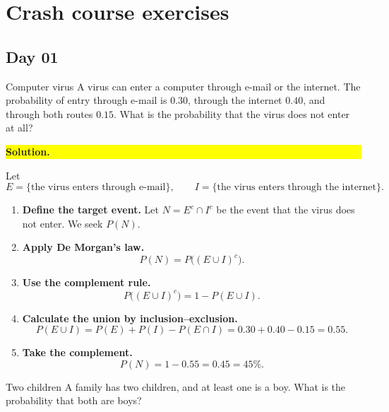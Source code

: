 \documentclass[a4paper,12pt,oneside]{report}
\newcommand{\solutionheading}[1]{%
  \par\Needspace{5\baselineskip}\noindent
  \begingroup\setlength{\fboxsep}{1pt}%
  \colorbox{yellow}{\strut\textbf{#1}}\endgroup\par\nobreak}
\begin{document}
\clearpage
\appendix

\chapter{Crash course exercises}


\section{Day 01}

\begin{framedexercise}{Computer virus}
A virus can enter a computer through e-mail or the internet. The
probability of entry through e-mail is $0.30$, through the internet
$0.40$, and through both routes $0.15$. What is the probability that
the virus does not enter at all?
\end{framedexercise}

\solutionheading{Solution.}
Let
\[
  E=\{\text{the virus enters through e-mail}\},\qquad
  I=\{\text{the virus enters through the internet}\}.
\]
\begin{enumerate}[label=\textbf{Step \arabic*:},leftmargin=*]
  \item \textbf{Define the target event.} Let $N=E^c\cap I^c$ be the
  event that the virus does not enter. We seek $P(N)$.
  \item \textbf{Apply De Morgan's law.}
  \[
    P(N)=P\bigl((E\cup I)^c\bigr).
  \]
  \item \textbf{Use the complement rule.}
  \[
    P\bigl((E\cup I)^c\bigr)=1-P(E\cup I).
  \]
  \item \textbf{Calculate the union by inclusion--exclusion.}
  \[
    P(E\cup I)=P(E)+P(I)-P(E\cap I)
      =0.30+0.40-0.15=0.55.
  \]
  \item \textbf{Take the complement.}
  \[
    \boxed{P(N)=1-0.55=0.45=45\%.}
  \]
\end{enumerate}

\begin{framedexercise}{Two children}
A family has two children, and at least one is a boy. What is the
probability that both are boys?
\end{framedexercise}
\end{document}
